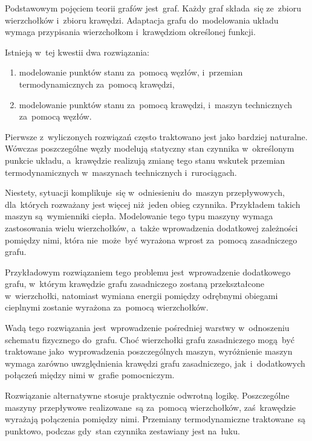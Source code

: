 Podstawowym pojęciem teorii grafów jest~graf. Każdy graf składa~się
ze~zbioru wierzchołków i~zbioru krawędzi. Adaptacja grafu do~modelowania
układu wymaga przypisania wierzchołkom i~krawędziom określonej funkcji.

Istnieją w~tej kwestii dwa rozwiązania:

\begin{enumerate}
	\item modelowanie punktów stanu za~pomocą węzłów, i~przemian
		termodynamicznych za~pomocą krawędzi,

	\item modelowanie punktów stanu za~pomocą krawędzi, i~maszyn
		technicznych za~pomocą węzłów.
\end{enumerate}



Pierwsze z~wyliczonych rozwiązań często traktowano jest jako bardziej
naturalne. Wówczas poszczególne węzły modelują statyczny stan czynnika
w~określonym punkcie układu, a~krawędzie realizują zmianę tego stanu
wskutek przemian termodynamicznych w~maszynach technicznych
i~rurociągach.

Niestety, sytuacji komplikuje~się w~odniesieniu do~maszyn przepływowych,
dla~których rozważany jest więcej niż~jeden obieg czynnika. Przykładem
takich maszyn są~wymienniki ciepła. Modelowanie tego typu maszyny wymaga
zastosowania wielu wierzchołków, a~także wprowadzenia dodatkowej
zależności pomiędzy nimi, która nie~może~być wyrażona wprost za~pomocą
zasadniczego grafu.

Przykładowym rozwiązaniem tego problemu jest~wprowadzenie dodatkowego
grafu, w~którym krawędzie grafu zasadniczego zostaną przekształcone
w~wierzchołki, natomiast wymiana energii pomiędzy odrębnymi obiegami
cieplnymi zostanie wyrażona za~pomocą wierzchołków.

Wadą tego rozwiązania jest~wprowadzenie pośredniej warstwy w~odnoszeniu
schematu fizycznego do~grafu. Choć wierzchołki grafu zasadniczego
mogą~być traktowane jako~wyprowadzenia poszczególnych maszyn,
wyróżnienie maszyn wymaga zarówno uwzględnienia krawędzi grafu
zasadniczego, jak~i~dodatkowych połączeń między nimi w~grafie
pomocniczym.

Rozwiązanie alternatywne stosuje praktycznie odwrotną logikę.
Poszczególne maszyny przepływowe realizowane~są za~pomocą wierzchołków,
zaś~krawędzie wyrażają połączenia pomiędzy nimi. Przemiany
termodynamiczne traktowane~są punktowo, podczas gdy~stan czynnika
zestawiany jest na~łuku.


